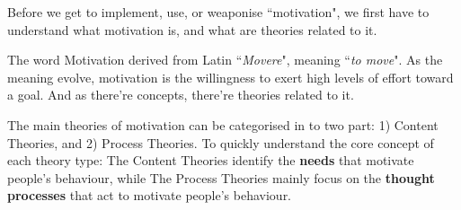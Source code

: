 \documentclass[11pt]{article}
\begin{document}
Before we get to implement, use, or weaponise ``motivation", we first have to understand what motivation is, and what are theories related to it.

The word Motivation derived from Latin ``\textit{Movere}", meaning ``\textit{to move}". As the meaning evolve, motivation is the willingness to exert high levels of effort toward a goal. And as there're concepts, there're theories related to it.

The main theories of motivation can be categorised in to two part: 1) Content Theories, and 2) Process Theories. To quickly understand the core concept of each theory type: The Content Theories identify the \textbf{needs} that motivate people's behaviour, while The Process Theories mainly focus on the \textbf{thought processes} that act to motivate people's behaviour.
\end{document}
